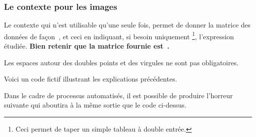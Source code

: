 \documentclass[10pt, a4paper]{article}
\begin{document}

\subsubsection{Le contexte  pour les images}

Le contexte  qui n'est utilisable qu'une seule fois, permet de donner la matrice des données de façon \,, et ceci en indiquant, si besoin uniquement
\footnote{
	Ceci permet de taper un simple tableau à double entrée.
},
l'expression étudiée.
\textbf{Bien retenir que la matrice fournie est \,.}




\begin{tdocnote}
    Les espaces autour des doubles points et des virgules ne sont pas obligatoires.
\end{tdocnote}




Voici un code fictif illustrant les explications précédentes.



Dans le cadre de processus automatisés, il est possible de produire l'horreur suivante qui aboutira à la même sortie que le code ci-dessus.

\end{document}
